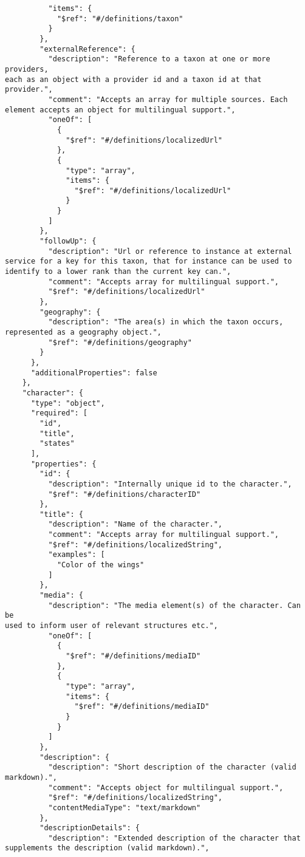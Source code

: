 \documentclass[10pt,letterpaper]{article}
\begin{document}
\begin{verbatim}
          "items": {
            "$ref": "#/definitions/taxon"
          }
        },
        "externalReference": {
          "description": "Reference to a taxon at one or more providers,
each as an object with a provider id and a taxon id at that provider.",
          "comment": "Accepts an array for multiple sources. Each
element accepts an object for multilingual support.",
          "oneOf": [
            {
              "$ref": "#/definitions/localizedUrl"
            },
            {
              "type": "array",
              "items": {
                "$ref": "#/definitions/localizedUrl"
              }
            }
          ]
        },
        "followUp": {
          "description": "Url or reference to instance at external
service for a key for this taxon, that for instance can be used to
identify to a lower rank than the current key can.",
          "comment": "Accepts array for multilingual support.",
          "$ref": "#/definitions/localizedUrl"
        },
        "geography": {
          "description": "The area(s) in which the taxon occurs,
represented as a geography object.",
          "$ref": "#/definitions/geography"
        }
      },
      "additionalProperties": false
    },
    "character": {
      "type": "object",
      "required": [
        "id",
        "title",
        "states"
      ],
      "properties": {
        "id": {
          "description": "Internally unique id to the character.",
          "$ref": "#/definitions/characterID"
        },
        "title": {
          "description": "Name of the character.",
          "comment": "Accepts array for multilingual support.",
          "$ref": "#/definitions/localizedString",
          "examples": [
            "Color of the wings"
          ]
        },
        "media": {
          "description": "The media element(s) of the character. Can be
used to inform user of relevant structures etc.",
          "oneOf": [
            {
              "$ref": "#/definitions/mediaID"
            },
            {
              "type": "array",
              "items": {
                "$ref": "#/definitions/mediaID"
              }
            }
          ]
        },
        "description": {
          "description": "Short description of the character (valid
markdown).",
          "comment": "Accepts object for multilingual support.",
          "$ref": "#/definitions/localizedString",
          "contentMediaType": "text/markdown"
        },
        "descriptionDetails": {
          "description": "Extended description of the character that
supplements the description (valid markdown).",

\end{verbatim}
\end{document}
